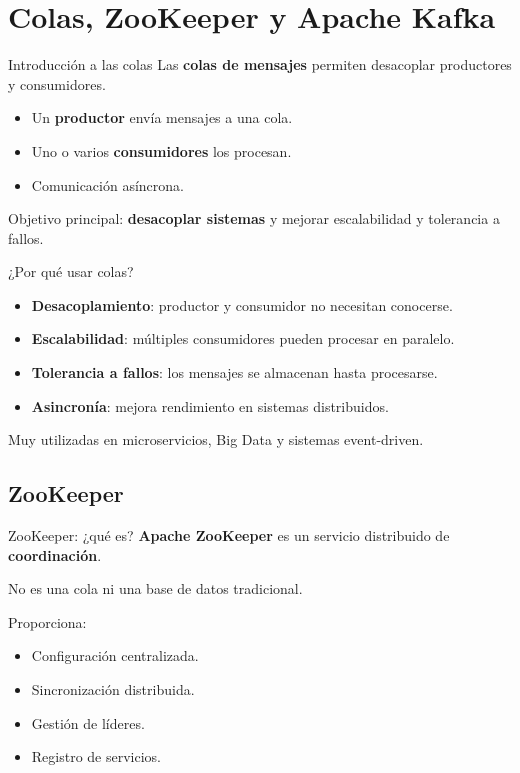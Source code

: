 \documentclass{beamer}
\begin{document}
\section{Colas, ZooKeeper y Apache Kafka}

\begin{frame}{Introducción a las colas}
Las \textbf{colas de mensajes} permiten desacoplar productores y consumidores.

\begin{itemize}
    \item Un \textbf{productor} envía mensajes a una cola.
    \item Uno o varios \textbf{consumidores} los procesan.
    \item Comunicación asíncrona.
\end{itemize}

\medskip
Objetivo principal: \textbf{desacoplar sistemas} y mejorar escalabilidad y tolerancia a fallos.
\end{frame}

\begin{frame}{¿Por qué usar colas?}
\begin{itemize}
    \item \textbf{Desacoplamiento}: productor y consumidor no necesitan conocerse.
    \item \textbf{Escalabilidad}: múltiples consumidores pueden procesar en paralelo.
    \item \textbf{Tolerancia a fallos}: los mensajes se almacenan hasta procesarse.
    \item \textbf{Asincronía}: mejora rendimiento en sistemas distribuidos.
\end{itemize}

\medskip
Muy utilizadas en microservicios, Big Data y sistemas event-driven.
\end{frame}

\subsection*{ZooKeeper}

\begin{frame}{ZooKeeper: ¿qué es?}
\textbf{Apache ZooKeeper} es un servicio distribuido de \textbf{coordinación}.

No es una cola ni una base de datos tradicional.

Proporciona:
\begin{itemize}
    \item Configuración centralizada.
    \item Sincronización distribuida.
    \item Gestión de líderes.
    \item Registro de servicios.
\end{itemize}
\end{frame}
\end{document}
